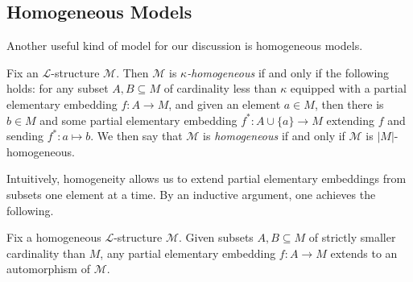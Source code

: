\documentclass[../notes.tex]{subfiles}
\begin{document}
\subsection{Homogeneous Models}
Another useful kind of model for our discussion is homogeneous models.
\begin{defihelper} 
	Fix an $\mathcal L$-structure $\mathcal M$. Then $\mathcal M$ is \textit{$\kappa$-homogeneous} if and only if the following holds: for any subset $A,B\subseteq M$ of cardinality less than $\kappa$ equipped with a partial elementary embedding $f\colon A\to M$, and given an element $a\in M$, then there is $b\in M$ and some partial elementary embedding $f^*\colon A\cup\{a\}\to M$ extending $f$ and sending $f^*\colon a\mapsto b$. We then say that $\mathcal M$ is \textit{homogeneous} if and only if $\mathcal M$ is $\left|M\right|$-homogeneous.
\end{defihelper}
Intuitively, homogeneity allows us to extend partial elementary embeddings from subsets one element at a time. By an inductive argument, one achieves the following.
\begin{proposition}
	Fix a homogeneous $\mathcal L$-structure $\mathcal M$. Given subsets $A,B\subseteq M$ of strictly smaller cardinality than $M$, any partial elementary embedding $f\colon A\to M$ extends to an automorphism of $\mathcal M$.
\end{proposition}
\end{document}
